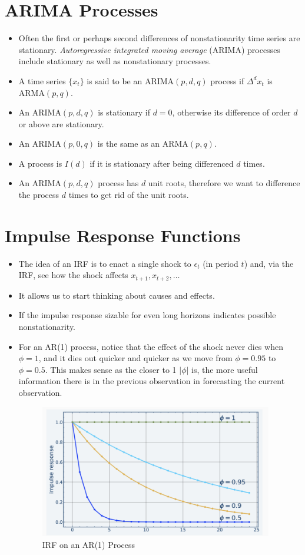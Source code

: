 \documentclass[11pt]{article}
\begin{document}
\section{ARIMA Processes}
\begin{itemize}
    \item Often the first or perhaps second differences of nonstationarity time series are 
    stationary. \textit{Autoregressive integrated moving average} (ARIMA) processes include 
    stationary as well as nonstationary processes.
    \item A time series $\{x_t\}$ is said to be an $\text{ARIMA}(p,d,q)$ process if $\Delta^d 
    x_t$ is $\text{ARMA}(p,q)$.
    \item An $\text{ARIMA}(p,d,q)$ is stationary if $d=0$, otherwise its difference of order 
    $d$ or above are stationary. 
    \item An $\text{ARIMA}(p,0,q)$ is the same as an $\text{ARMA}(p,q)$.
    \item A process is $I(d)$ if it is stationary after being differenced $d$ times.
    \item An $\text{ARIMA}(p,d,q)$ process has $d$ unit roots, therefore we want to difference 
    the process $d$ times to get rid of the unit roots. 
\end{itemize}

\section{Impulse Response Functions}
\begin{itemize}
    \item The idea of an IRF is to enact a single shock to $\epsilon_t$ (in period $t$) and,
    via the IRF, see how the shock affects $x_{t+1}, x_{t+2}, \ldots$
    \item It allows us to start thinking about causes and effects.
    \item If the impulse response sizable for even long horizons indicates possible 
    nonstationarity. 
    \item For an AR(1) process, notice that the effect of the shock never dies when $\phi=1$,
    and it dies out quicker and quicker as we move from $\phi=0.95$ to $\phi=0.5$. This makes 
    sense as the closer to 1 $|\phi|$ is, the more useful information there is in the previous 
    observation in forecasting the current observation.
    \begin{figure}[H] 
        \centering 
        \includegraphics[width=4in]{imgs/irf.png}
        \caption{IRF on an AR(1) Process}
    \end{figure}
\end{itemize}
\end{document}
